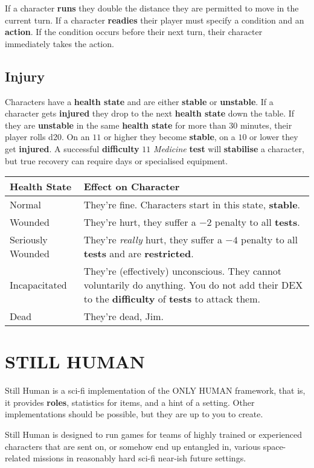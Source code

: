 \documentclass[11pt]{article}
\begin{document}
\begin{multicols}{3}
  If a character \textbf{runs} they double the distance they are permitted to move in the current turn. If a character \textbf{readies} their player must specify a condition and an \textbf{action}. If the condition occurs before their next turn, their character immediately takes the action.

  \subsection*{Injury}

  Characters have a \textbf{health state} and are either \textbf{stable} or \textbf{unstable}. If a character gets \textbf{injured} they drop to the next \textbf{health state} down the table. If they are \textbf{unstable} in the same \textbf{health state} for more than $30$ minutes, their player rolls d20. On an $11$ or higher they become \textbf{stable}, on a $10$ or lower they get \textbf{injured}. A successful \textbf{difficulty} $11$ \textit{Medicine} \textbf{test} will \textbf{stabilise} a character, but true recovery can require days or specialised equipment.

  \begin{tabularx}{\linewidth}{lX}
    Health State & Effect on Character \\
    \hline
    Normal & They're fine. Characters start in this state, \textbf{stable}. \\
    Wounded & They're hurt, they suffer a $-2$ penalty to all \textbf{tests}. \\
    Seriously Wounded & They're \textit{really} hurt, they suffer a $-4$ penalty to all \textbf{tests} and are \textbf{restricted}. \\
    Incapacitated & They're (effectively) unconscious. They cannot voluntarily do anything. You do not add their DEX to the \textbf{difficulty} of \textbf{tests} to attack them. \\
    Dead & They're dead, Jim.
  \end{tabularx}

  \section*{STILL HUMAN}

  Still Human is a sci-fi implementation of the ONLY HUMAN framework, that is, it provides \textbf{roles}, statistics for items, and a hint of a setting. Other implementations should be possible, but they are up to you to create.

  Still Human is designed to run games for teams of highly trained or experienced characters that are sent on, or somehow end up entangled in, various space-related missions in reasonably hard sci-fi near-ish future settings.


\end{multicols}
\end{document}
